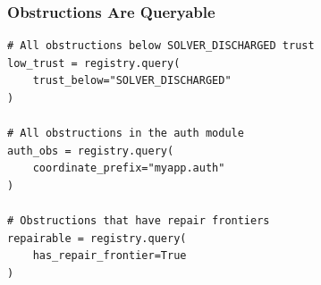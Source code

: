 \begin{frame}[fragile]
\frametitle{Obstructions Are Queryable}
\begin{lstlisting}
# All obstructions below SOLVER_DISCHARGED trust
low_trust = registry.query(
    trust_below="SOLVER_DISCHARGED"
)

# All obstructions in the auth module
auth_obs = registry.query(
    coordinate_prefix="myapp.auth"
)

# Obstructions that have repair frontiers
repairable = registry.query(
    has_repair_frontier=True
)
\end{lstlisting}
\vspace{6pt}
\begin{center}
\end{center}
\end{frame}

